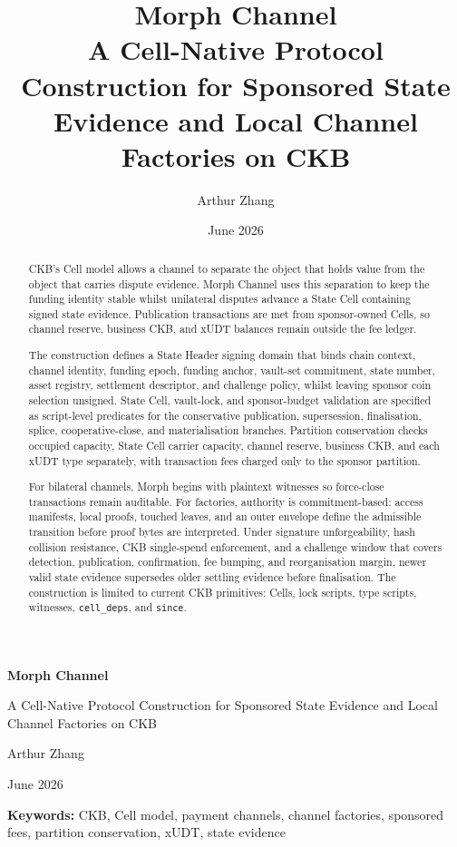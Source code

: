 \documentclass[a4paper,11pt]{article}
\title{\textbf{Morph Channel}\\
\large A Cell-Native Protocol Construction for Sponsored State Evidence and Local Channel Factories on CKB}
\author{Arthur Zhang}
\date{June 2026}
\begin{document}
\begin{titlepage}
\centering
\vspace*{1.1cm}
{\sffamily\bfseries\LARGE Morph Channel\par}
\vspace{0.35cm}
{\sffamily\large A Cell-Native Protocol Construction for Sponsored State Evidence and Local Channel Factories on CKB\par}
\vspace{1.35cm}
{\normalsize Arthur Zhang\par}
\vspace{0.20cm}
{\normalsize June 2026\par}
\vspace{1.3cm}

\begin{abstract}
\noindent
CKB's Cell model allows a channel to separate the object that holds value from the object that carries dispute evidence. Morph Channel uses this separation to keep the funding identity stable whilst unilateral disputes advance a State Cell containing signed state evidence. Publication transactions are met from sponsor-owned Cells, so channel reserve, business CKB, and xUDT balances remain outside the fee ledger.

\medskip
\noindent
The construction defines a State Header signing domain that binds chain context, channel identity, funding epoch, funding anchor, vault-set commitment, state number, asset registry, settlement descriptor, and challenge policy, whilst leaving sponsor coin selection unsigned. State Cell, vault-lock, and sponsor-budget validation are specified as script-level predicates for the conservative publication, supersession, finalisation, splice, cooperative-close, and materialisation branches. Partition conservation checks occupied capacity, State Cell carrier capacity, channel reserve, business CKB, and each xUDT type separately, with transaction fees charged only to the sponsor partition.

\medskip
\noindent
For bilateral channels, Morph begins with plaintext witnesses so force-close transactions remain auditable. For factories, authority is commitment-based: access manifests, local proofs, touched leaves, and an outer envelope define the admissible transition before proof bytes are interpreted. Under signature unforgeability, hash collision resistance, CKB single-spend enforcement, and a challenge window that covers detection, publication, confirmation, fee bumping, and reorganisation margin, newer valid state evidence supersedes older settling evidence before finalisation. The construction is limited to current CKB primitives: Cells, lock scripts, type scripts, witnesses, \texttt{cell\_deps}, and \texttt{since}.
\end{abstract}

\vfill
\begin{flushleft}
\textbf{Keywords:} CKB, Cell model, payment channels, channel factories, sponsored fees, partition conservation, xUDT, state evidence
\end{flushleft}
\end{titlepage}
\end{document}
